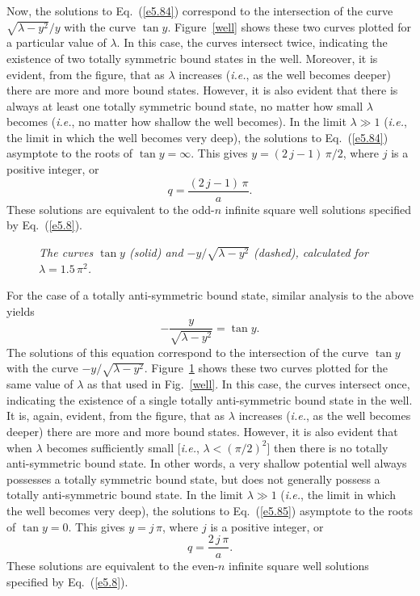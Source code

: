 Now, the solutions to Eq.~(\ref{e5.84}) correspond to the
intersection of the curve $\sqrt{\lambda - y^2}/y$ with the curve
$\tan y$. Figure~\ref{well} shows these two curves plotted for
a particular value of $\lambda$. In this case, the curves intersect
twice, indicating the existence of two totally symmetric bound states in the well.
Moreover, it is evident, from the figure, that as $\lambda$ increases ({\em i.e.}, as the well becomes
deeper)  there are more and more bound states. However, it is also evident that there is
always at least one totally symmetric bound state, no matter how small $\lambda$
becomes ({\em i.e.}, no matter how shallow the well becomes). In the limit $\lambda\gg 1$
({\em i.e.}, the limit in which the well becomes very deep), the
solutions to Eq.~(\ref{e5.84}) asymptote to the roots of $\tan y =\infty$.
This gives $y = (2\,j-1)\,\pi/2$, where $j$ is a positive integer, or
\begin{equation}
q = \frac{(2\,j-1)\,\pi}{a}.
\end{equation}
These solutions are equivalent to the odd-$n$ infinite square well solutions 
specified by Eq.~(\ref{e5.8}).

\begin{figure}
\epsfysize=3in
\centerline{}
\caption{\em The curves $\tan y$ (solid) and $-y/\sqrt{\lambda - y^2}$ (dashed), calculated for $\lambda = 1.5\,\pi^2$. }\label{well1}   
\end{figure}

For the case of a totally anti-symmetric bound state, similar analysis to the
above yields 
\begin{equation}\label{e5.85}
-\frac{y}{\sqrt{\lambda-y^2}} = \tan y.
\end{equation}
The solutions of this equation correspond to the intersection of the
curve $\tan y$ with the curve  $-y/\sqrt{\lambda-y^2}$. Figure~\ref{well1} shows these two curves plotted for
the same value of $\lambda$ as that used in Fig.~\ref{well}. In this
case, the curves intersect once, indicating the existence of
a single totally anti-symmetric bound state in the well. It is, again, evident, from the figure, that as $\lambda$ increases ({\em i.e.}, as the well becomes
deeper) there are more and more bound states. However, it is also evident that
when $\lambda$ becomes sufficiently small [{\em i.e.}, $\lambda < (\pi/2)^2$] then there is no totally
anti-symmetric bound state. In other words, a very shallow potential well
always possesses a totally symmetric bound state, but does not generally
possess a totally anti-symmetric bound state. In the limit $\lambda\gg 1$
({\em i.e.}, the limit in which the well becomes very deep), the
solutions to Eq.~(\ref{e5.85}) asymptote to the roots of $\tan y =0$.
This gives $y = j\,\pi$, where $j$ is a positive integer, or
\begin{equation}
q = \frac{2\,j\,\pi}{a}.
\end{equation}
These solutions are equivalent to the even-$n$ infinite square well solutions 
specified by Eq.~(\ref{e5.8}).

